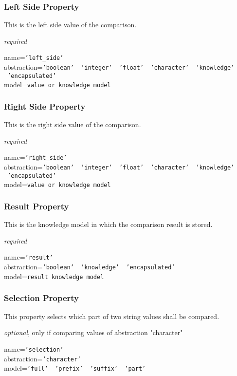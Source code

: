 \subsubsection{Left Side Property}

This is the left side value of the comparison.

\emph{required}

name=\texttt{'left\_side'}\\
abstraction=\texttt{'boolean' \vline\ 'integer' \vline\ 'float' \vline\ 'character' \vline\ 'knowledge' \vline\ 'encapsulated'}\\
model=\texttt{value or knowledge model}

\subsubsection{Right Side Property}

This is the right side value of the comparison.

\emph{required}

name=\texttt{'right\_side'}\\
abstraction=\texttt{'boolean' \vline\ 'integer' \vline\ 'float' \vline\ 'character' \vline\ 'knowledge' \vline\ 'encapsulated'}\\
model=\texttt{value or knowledge model}

\subsubsection{Result Property}

This is the knowledge model in which the comparison result is stored.

\emph{required}

name=\texttt{'result'}\\
abstraction=\texttt{'boolean' \vline\ 'knowledge' \vline\ 'encapsulated'}\\
model=\texttt{result knowledge model}

\subsubsection{Selection Property}

This property selects which part of two string values shall be compared.

\emph{optional}, only if comparing values of abstraction "character"

name=\texttt{'selection'}\\
abstraction=\texttt{'character'}\\
model=\texttt{'full' \vline\ 'prefix' \vline\ 'suffix' \vline\ 'part'}
